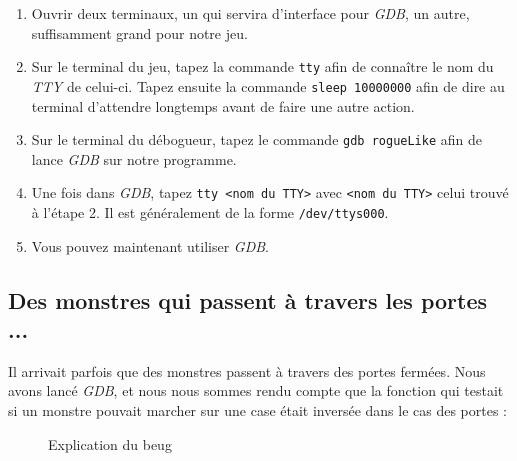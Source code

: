 \documentclass[11pt]{report}
\begin{document}
		\begin{enumerate}
		\item Ouvrir deux terminaux, un qui servira d'interface pour \emph{GDB}, un autre, suffisamment grand pour notre jeu.
		\item Sur le terminal du jeu, tapez la commande \texttt{tty} afin de connaître le nom du \emph{TTY} de celui-ci. Tapez ensuite la commande \texttt{sleep 10000000} afin de dire au terminal d'attendre longtemps avant de faire une autre action.
		\item Sur le terminal du débogueur, tapez le commande \texttt{gdb rogueLike} afin de lance \emph{GDB} sur notre programme.
		\item Une fois dans \emph{GDB}, tapez \texttt{tty <nom du TTY>} avec \texttt{<nom du TTY>} celui trouvé à l'étape 2. Il est généralement de la forme \texttt{/dev/ttys000}.
		\item Vous pouvez maintenant utiliser \emph{GDB}.
		\end{enumerate}


	\subsection*{Des monstres qui passent à travers les portes ...}
		Il arrivait parfois que des monstres passent à travers des portes fermées. Nous avons lancé \emph{GDB}, et nous nous sommes rendu compte que la fonction qui testait si un monstre pouvait marcher sur une case était inversée dans le cas des portes :

			\begin{figure}[ht]
			    \centering
			    \qquad
			    \caption{Explication du beug}%
			\end{figure}
\end{document}
